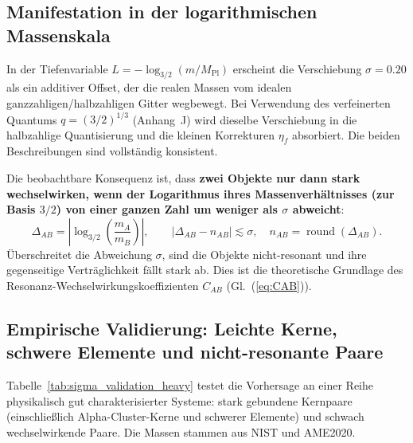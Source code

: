 \documentclass[11pt,a4paper]{article}
\theoremstyle{remark}
\begin{document}
	\subsection{Manifestation in der logarithmischen Massenskala}
	
	In der Tiefenvariable \(L = -\log_{3/2}(m/M_{\mathrm{Pl}})\) erscheint die Verschiebung \(\sigma = 0.20\) als ein additiver Offset, der die realen Massen vom idealen ganzzahligen/halbzahligen Gitter wegbewegt. Bei Verwendung des verfeinerten Quantums \(q = (3/2)^{1/3}\) (Anhang~J) wird dieselbe Verschiebung in die halbzahlige Quantisierung und die kleinen Korrekturen \(\eta_f\) absorbiert. Die beiden Beschreibungen sind vollständig konsistent.
	
	Die beobachtbare Konsequenz ist, dass \textbf{zwei Objekte nur dann stark wechselwirken, wenn der Logarithmus ihres Massenverhältnisses (zur Basis \(3/2\)) von einer ganzen Zahl um weniger als \(\sigma\) abweicht}:
	\begin{equation}
		\Delta_{AB} = \left| \log_{3/2}\!\left(\frac{m_A}{m_B}\right) \right|,\qquad |\Delta_{AB} - n_{AB}| \lesssim \sigma,\quad n_{AB} = \operatorname{round}(\Delta_{AB}).
	\end{equation}
	Überschreitet die Abweichung \(\sigma\), sind die Objekte nicht-resonant und ihre gegenseitige Verträglichkeit fällt stark ab. Dies ist die theoretische Grundlage des Resonanz-Wechselwirkungskoeffizienten \(C_{AB}\) (Gl.~(\ref{eq:CAB})).
	
	\subsection{Empirische Validierung: Leichte Kerne, schwere Elemente und nicht-resonante Paare}
	
	Tabelle~\ref{tab:sigma_validation_heavy} testet die Vorhersage an einer Reihe physikalisch gut charakterisierter Systeme: stark gebundene Kernpaare (einschließlich Alpha-Cluster-Kerne und schwerer Elemente) und schwach wechselwirkende Paare. Die Massen stammen aus NIST und AME2020.
	
\end{document}
